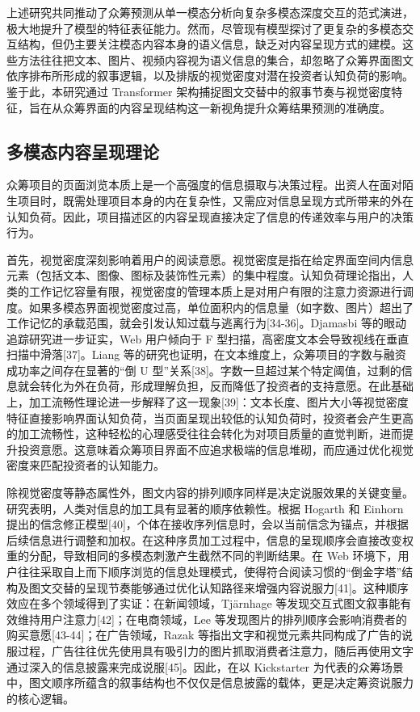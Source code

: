 上述研究共同推动了众筹预测从单一模态分析向复杂多模态深度交互的范式演进，极大地提升了模型的特征表征能力。然而，尽管现有模型探讨了更复杂的多模态交互结构，但仍主要关注模态内容本身的语义信息，缺乏对内容呈现方式的建模。这些方法往往把文本、图片、视频内容视为语义信息的集合，却忽略了众筹界面图文依序排布所形成的叙事逻辑，以及排版的视觉密度对潜在投资者认知负荷的影响。鉴于此，本研究通过 Transformer 架构捕捉图文交替中的叙事节奏与视觉密度特征，旨在从众筹界面的内容呈现结构这一新视角提升众筹结果预测的准确度。

\subsection{多模态内容呈现理论}

众筹项目的页面浏览本质上是一个高强度的信息摄取与决策过程。出资人在面对陌生项目时，既需处理项目本身的内在复杂性，又需应对信息呈现方式所带来的外在认知负荷。因此，项目描述区的内容呈现直接决定了信息的传递效率与用户的决策行为。

首先，视觉密度深刻影响着用户的阅读意愿。视觉密度是指在给定界面空间内信息元素（包括文本、图像、图标及装饰性元素）的集中程度。认知负荷理论指出，人类的工作记忆容量有限，视觉密度的管理本质上是对用户有限的注意力资源进行调度。如果多模态界面视觉密度过高，单位面积内的信息量（如字数、图片）超出了工作记忆的承载范围，就会引发认知过载与逃离行为[34-36]。Djamasbi 等的眼动追踪研究进一步证实，Web 用户倾向于 F 型扫描，高密度文本会导致视线在垂直扫描中滑落[37]。Liang 等的研究也证明，在文本维度上，众筹项目的字数与融资成功率之间存在显著的``倒 U 型''关系[38]。字数一旦超过某个特定阈值，过剩的信息就会转化为外在负荷，形成理解负担，反而降低了投资者的支持意愿。在此基础上，加工流畅性理论进一步解释了这一现象[39]：文本长度、图片大小等视觉密度特征直接影响界面认知负荷，当页面呈现出较低的认知负荷时，投资者会产生更高的加工流畅性，这种轻松的心理感受往往会转化为对项目质量的直觉判断，进而提升投资意愿。这意味着众筹项目界面不应追求极端的信息堆砌，而应通过优化视觉密度来匹配投资者的认知能力。

除视觉密度等静态属性外，图文内容的排列顺序同样是决定说服效果的关键变量。研究表明，人类对信息的加工具有显著的顺序依赖性。根据 Hogarth 和 Einhorn 提出的信念修正模型[40]，个体在接收序列信息时，会以当前信念为锚点，并根据后续信息进行调整和加权。在这种序贯加工过程中，信息的呈现顺序会直接改变权重的分配，导致相同的多模态刺激产生截然不同的判断结果。在 Web 环境下，用户往往采取自上而下顺序浏览的信息处理模式，使得符合阅读习惯的``倒金字塔''结构及图文交替的呈现节奏能够通过优化认知路径来增强内容说服力[41]。这种顺序效应在多个领域得到了实证：在新闻领域，Tjärnhage 等发现交互式图文叙事能有效维持用户注意力[42]；在电商领域，Lee 等发现图片的排列顺序会影响消费者的购买意愿[43-44]；在广告领域，Razak 等指出文字和视觉元素共同构成了广告的说服过程，广告往往优先使用具有吸引力的图片抓取消费者注意力，随后再使用文字通过深入的信息披露来完成说服[45]。因此，在以 Kickstarter 为代表的众筹场景中，图文顺序所蕴含的叙事结构也不仅仅是信息披露的载体，更是决定筹资说服力的核心逻辑。

